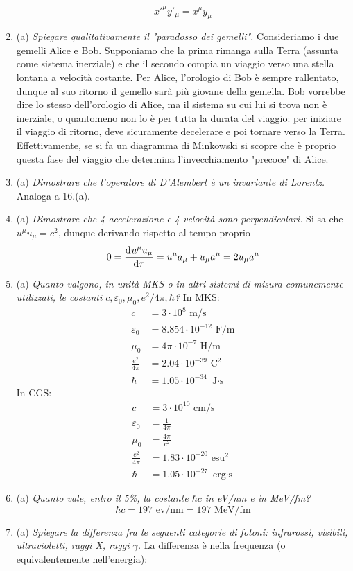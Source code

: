 \documentclass{article}
\renewcommand{\a}{(a)}
\renewcommand{\t}[1]{\textit{ #1}}
\begin{document}
\begin{enumerate}
		\[x'^\mu y'_\mu=x^\mu y_\mu\]
		\item\a\t{Spiegare qualitativamente il "paradosso dei gemelli".} Consideriamo i due gemelli Alice e Bob. Supponiamo che la prima rimanga sulla Terra (assunta come sistema inerziale) e che il secondo compia un viaggio verso una stella lontana a velocità costante. Per Alice, l'orologio di Bob è sempre rallentato, dunque al suo ritorno il gemello sarà più giovane della gemella. Bob vorrebbe dire lo stesso dell'orologio di Alice, ma il sistema su cui lui si trova non è inerziale, o quantomeno non lo è per tutta la durata del viaggio: per iniziare il viaggio di ritorno, deve sicuramente decelerare e poi tornare verso la Terra. Effettivamente, se si fa un diagramma di Minkowski si scopre che è proprio questa fase del viaggio che determina l'invecchiamento "precoce" di Alice.
		\item\a\t{Dimostrare che l'operatore di D'Alembert è un invariante di Lorentz.} Analoga a 16.\a.
		\item\a\t{Dimostrare che 4-accelerazione e 4-velocità sono perpendicolari.} Si sa che $u^\mu u_\mu=c^2$, dunque derivando rispetto al tempo proprio
		\[0=\dfrac{\mathrm{d} ^{}u^\mu u_\mu}{\mathrm{d} {\tau}^{}}=u^\mu a_\mu+u_\mu a^\mu=2u_\mu a^\mu\]
		\item\a\t{Quanto valgono, in unità MKS o in altri sistemi di misura comunemente utilizzati, le costanti $c,\varepsilon_0,\mu_0,e^2/4\pi,\hbar$?}
		In MKS:
		\begin{align*}
			c&=3\cdot10^8\textrm{ m/s}\\
			\varepsilon_0&=8.854\cdot10^{-12}\textrm{ F/m}\\
			\mu_0&=4\pi\cdot10^{-7}\textrm{ H/m}\\
			\frac{e^2}{4\pi}&=2.04\cdot10^{-39}\textrm{ C}^2\\
			\hbar&=1.05\cdot10^{-34}\textrm{ J$\cdot$s}
		\end{align*}
		In CGS:
		\begin{align*}
		c&=3\cdot10^{10}\textrm{ cm/s}\\
		\varepsilon_0&=\frac{1}{4\pi}\\
		\mu_0&=\frac{4\pi}{c^2}\\
		\frac{e^2}{4\pi}&=1.83\cdot10^{-20}\textrm{ esu}^2\\
		\hbar&=1.05\cdot10^{-27}\textrm{ erg$\cdot$s}
		\end{align*}
		\item\a\t{Quanto vale, entro il 5\%, la costante $\hbar c$ in \rm{eV/nm} e in \rm{MeV/fm}?}
		\[\hbar c=197\textrm{ ev/nm}=197\textrm{ MeV/fm}\]
		\item\a\t{Spiegare la differenza fra le seguenti categorie di fotoni: infrarossi, visibili, ultravioletti, raggi X, raggi $\gamma$.} La differenza è nella frequenza (o equivalentemente nell'energia):
		

\end{enumerate}
\end{document}

